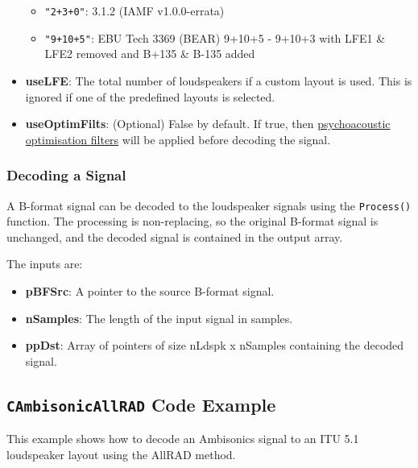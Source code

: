 \documentclass[12pt]{report}
\newcommand{\code}[1]{\texttt{#1}}
\begin{document}
\begin{itemize}
\begin{itemize}
        \item \code{"2+3+0"}: 3.1.2 (IAMF v1.0.0-errata)
        \item \code{"9+10+5"}: EBU Tech 3369 (BEAR) 9+10+5 - 9+10+3 with LFE1 \& LFE2 removed and B+135 \& B-135 added
    \end{itemize}
    \item \textbf{useLFE}: The total number of loudspeakers if a custom layout is used. This is ignored if one of the predefined layouts is selected.
    \item \textbf{useOptimFilts}: (Optional) False by default. If true, then \href{AmbisonicOptimsiation.md}{psychoacoustic optimisation filters} will be applied before decoding the signal.
\end{itemize}

\subsubsection{Decoding a Signal}

A B-format signal can be decoded to the loudspeaker signals using the \code{Process()} function. The processing is non-replacing, so the original B-format signal is unchanged, and the decoded signal is contained in the output array.

The inputs are:
\begin{itemize}
    \item \textbf{pBFSrc}: A pointer to the source B-format signal.
    \item \textbf{nSamples}: The length of the input signal in samples.
    \item \textbf{ppDst}: Array of pointers of size nLdspk x nSamples containing the decoded signal.
\end{itemize}

\subsection{\code{CAmbisonicAllRAD} Code Example}

This example shows how to decode an Ambisonics signal to an ITU 5.1 loudspeaker layout using the AllRAD method.
\end{document}
